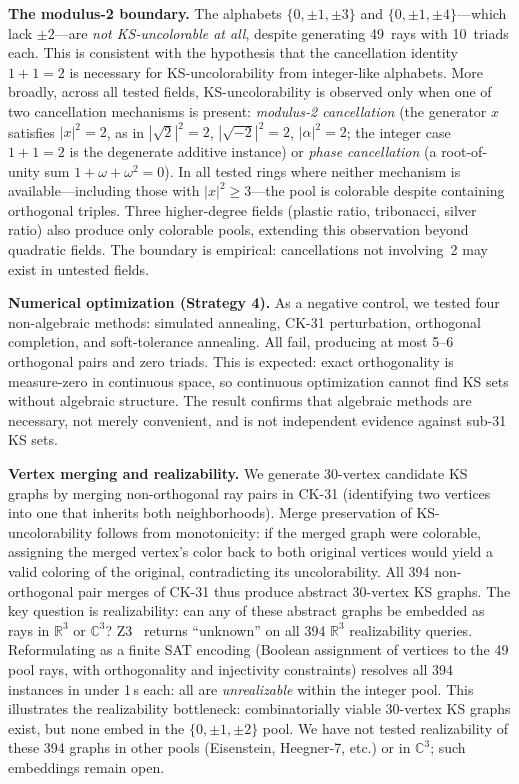 \documentclass[twocolumn,prl,superscriptaddress,nofootinbib]{revtex4-2}
\newcommand{\R}{\mathbb{R}}
\newcommand{\C}{\mathbb{C}}
\begin{document}
\textbf{The modulus-2 boundary.} The alphabets $\{0,\pm1,\pm3\}$ and $\{0,\pm1,\pm4\}$---which lack $\pm2$---are \emph{not KS-uncolorable at all}, despite generating 49~rays with 10~triads each.  This is consistent with the hypothesis that the cancellation identity $1+1=2$ is necessary for KS-uncolorability from integer-like alphabets. More broadly, across all tested fields, KS-uncolorability is observed only when one of two cancellation mechanisms is present: \emph{modulus-2 cancellation} (the generator $x$ satisfies $|x|^2 = 2$, as in $|\sqrt{2}|^2=2$, $|\sqrt{-2}|^2=2$, $|\alpha|^2=2$; the integer case $1+1=2$ is the degenerate additive instance) or \emph{phase cancellation} (a root-of-unity sum $1+\omega+\omega^2=0$).  In all tested rings where neither mechanism is available---including those with $|x|^2 \geq 3$---the pool is colorable despite containing orthogonal triples.  Three higher-degree fields (plastic ratio, tribonacci, silver ratio) also produce only colorable pools, extending this observation beyond quadratic fields.  The boundary is empirical: cancellations not involving~2 may exist in untested fields.

\textbf{Numerical optimization (Strategy 4).} As a negative control, we tested four non-algebraic methods: simulated annealing, CK-31 perturbation, orthogonal completion, and soft-tolerance annealing.  All fail, producing at most 5--6 orthogonal pairs and zero triads.  This is expected: exact orthogonality is measure-zero in continuous space, so continuous optimization cannot find KS sets without algebraic structure.  The result confirms that algebraic methods are necessary, not merely convenient, and is not independent evidence against sub-31 KS sets.

\textbf{Vertex merging and realizability.} We generate 30-vertex candidate KS graphs by merging non-orthogonal ray pairs in CK-31 (identifying two vertices into one that inherits both neighborhoods).  Merge preservation of KS-uncolorability follows from monotonicity: if the merged graph were colorable, assigning the merged vertex's color back to both original vertices would yield a valid coloring of the original, contradicting its uncolorability.  All 394 non-orthogonal pair merges of CK-31 thus produce abstract 30-vertex KS graphs.  The key question is realizability: can any of these abstract graphs be embedded as rays in $\R^3$ or $\C^3$?  Z3~\cite{Z3} returns ``unknown'' on all 394 $\R^3$ realizability queries.  Reformulating as a finite SAT encoding (Boolean assignment of vertices to the 49 pool rays, with orthogonality and injectivity constraints) resolves all 394 instances in under 1\,s each: all are \emph{unrealizable} within the integer pool.  This illustrates the realizability bottleneck: combinatorially viable 30-vertex KS graphs exist, but none embed in the $\{0,\pm1,\pm2\}$ pool.  We have not tested realizability of these 394 graphs in other pools (Eisenstein, Heegner-7, etc.) or in $\C^3$; such embeddings remain open.
\end{document}
